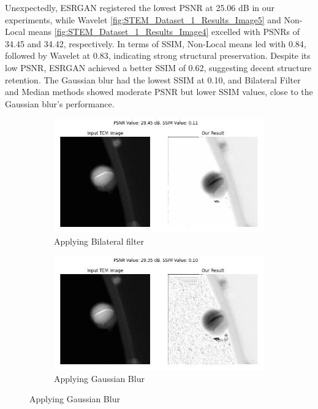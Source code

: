 \vspace{10pt}
Unexpectedly, ESRGAN registered the lowest PSNR at 25.06 dB in our experiments, while Wavelet \ref{fig:STEM_Dataset_1_Results_Image5} and Non-Local means \ref{fig:STEM_Dataset_1_Results_Image4} excelled with PSNRs of 34.45 and 34.42, respectively. In terms of SSIM, Non-Local means led with 0.84, followed by Wavelet at 0.83, indicating strong structural preservation. Despite its low PSNR, ESRGAN achieved a better SSIM of 0.62, suggesting decent structure retention. The Gaussian blur had the lowest SSIM at 0.10, and Bilateral Filter and Median methods showed moderate PSNR but lower SSIM values, close to the Gaussian blur's performance.



\begin{figure}[H]
    \centering
    \begin{subfigure}{.47\textwidth} %
        \includegraphics[width=\textwidth]{img/Results/STEM dataset 1/STEM_Data_1_bilateral_filter.jpg}
        \caption{Applying Bilateral filter}
        \label{fig:Image1}
    \end{subfigure}
    \hfill
    \begin{subfigure}{.47\textwidth} %
        \includegraphics[width=\textwidth]{img/Results/STEM dataset 1/STEM_Data_1_gaussian_blur.jpg}
        \caption{Applying Gaussian Blur}
        \label{fig:Image2}
    \end{subfigure}
    

\end{figure}
